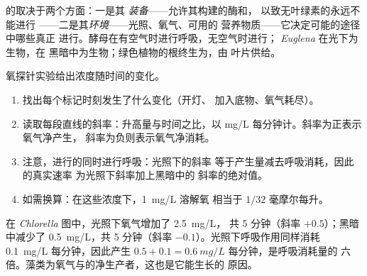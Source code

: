 \begin{proposition}[基因与环境]\label{prop:g10:cell-metabolism:decides}
的取决于两个方面：一是其
\emph{装备}——允许其构建的酶和，
以致无叶绿素的永远不能进行
——二是其\emph{环境}——光照、氧气、可用的
营养物质——它决定可能的途径中哪些真正
进行。酵母在有空气时进行呼吸，无空气时进行；
\emph{Euglena} 在光下为生物，在
黑暗中为生物；绿色植物的根终生为，由
叶片供给。
\end{proposition}
\admitted

\begin{method}[读取代谢曲线]\label{met:g10:cell-metabolism:trace}
氧探针实验给出浓度随时间的变化。
\begin{enumerate}
  \item 找出每个标记时刻发生了什么变化（开灯、
        加入底物、氧气耗尽）。
  \item 读取每段直线的斜率：升高量与时间之比，以
        \unit{mg/L} 每分钟计。斜率为正表示氧气净产生，
        斜率为负则表示氧气净消耗。
  \item 注意，进行的同时进行呼吸：光照下的斜率
        等于产生量减去呼吸消耗，因此的真实速率
        为光照下斜率加上黑暗中的
        斜率的绝对值。
  \item 如需换算：在这些浓度下，\qty{1}{mg/L} 溶解氧
        相当于 $1/32$ 毫摩尔每升。
\end{enumerate}
\end{method}

\begin{example}[藻类的真实速率]\label{ex:g10:cell-metabolism:truerate}
在 \emph{Chlorella} 图中，光照下氧气增加了 \qty{2.5}{mg/L}，
共 5 分钟（斜率 $+0.5$）；黑暗中减少了 \qty{0.5}{mg/L}，共
5 分钟（斜率 $-0.1$）。光照下呼吸作用同样消耗 \qty{0.1}{mg/L}
每分钟，因此产生
$0.5 + 0.1 = \qty{0.6}{mg/L}$ 每分钟，是呼吸消耗量的
六倍。藻类为氧气与的净生产者，这也是它能生长的
原因。
\end{example}

